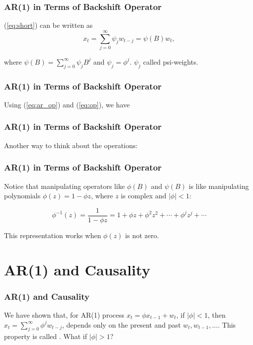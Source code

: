 \documentclass[%
xcolor=pdftex]{beamer}
\begin{document}
\begin{frame}
\frametitle{AR(1) in Terms of Backshift Operator}

(\ref{eq:short}) can be written as
\begin{equation} \label{eq:op}
x_t=\sum_{j=0}^{\infty} \psi_j w_{t-j} = \psi(B)w_t,
\end{equation}

where $\psi(B) = \sum_{j=0}^{\infty} \psi_j B^j$ and $\psi_j = \phi^j$. $\psi_j$ called psi-weights.

\end{frame}

\begin{frame}
\frametitle{AR(1) in Terms of Backshift Operator}

Using (\ref{eq:ar_op}) and (\ref{eq:op}), we have

\vspace{50mm}

\end{frame}

\begin{frame}
\frametitle{AR(1) in Terms of Backshift Operator}

Another way to think about the operations:

\vspace{50mm}


\end{frame}

\begin{frame}
\frametitle{AR(1) in Terms of Backshift Operator}

Notice that manipulating operators like $\phi(B)$ and $\psi(B)$ is like manipulating polynomials $\phi(z) = 1-\phi z$, where $z$ is complex and $|\phi| < 1$:

$$
\phi^{-1}(z) = \frac{1}{1- \phi z} = 1 + \phi z + \phi^2 z^2 + \cdots + \phi^j z^j + \cdots
$$


This representation works when $\phi(z)$ is not zero.

\end{frame}


\section{AR(1) and Causality}
\frame{\tableofcontents[currentsection]}

\begin{frame}
\frametitle{AR(1) and Causality}

We have shown that, for AR(1) process $x_t=\phi x_{t-1}+w_t$, if $|\phi|<1$,
 then $x_t=\sum^{\infty}_{j=0} \phi^j w_{t-j}$, depends only on
 the present and past $w_t,w_{t-1},\ldots.$ This property is called \underline{\hspace{15 mm}}. What if $|\phi| > 1$?


\end{frame}
\end{document}
